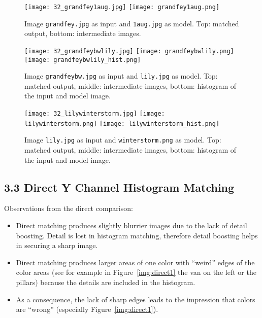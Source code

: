 \documentclass[11pt,a4paper]{article}
\begin{document}
\begin{figure}[htb]
    \begin{center}
    	\texttt{[image: 32\_grandfey1aug.jpg]}
    	\texttt{[image: grandfey1aug.png]}
        \caption{Image \texttt{grandfey.jpg} as input and \texttt{1aug.jpg} as model. Top: matched output, bottom: intermediate images.}
    \end{center}
\end{figure}

\begin{figure}[htb]
    \begin{center}
    	\texttt{[image: 32\_grandfeybwlily.jpg]}
    	\texttt{[image: grandfeybwlily.png]}
    	\texttt{[image: grandfeybwlily\_hist.png]}
        \caption{Image \texttt{grandfeybw.jpg} as input and \texttt{lily.jpg} as model. Top: matched output, middle: intermediate images, bottom: histogram of the input and model image.}
    \end{center}
\end{figure}

\begin{figure}[htb]
    \begin{center}
    	\texttt{[image: 32\_lilywinterstorm.jpg]}
    	\texttt{[image: lilywinterstorm.png]}
    	\texttt{[image: lilywinterstorm\_hist.png]}
        \caption{Image \texttt{lily.jpg} as input and \texttt{winterstorm.png} as model. Top: matched output, middle: intermediate images, bottom: histogram of the input and model image.}
    \end{center}
\end{figure}

\FloatBarrier
\subsection*{3.3 Direct Y Channel Histogram Matching}
Observations from the direct comparison:
\begin{itemize}
\item Direct matching produces slightly blurrier images due to the lack of detail boosting. Detail is lost in histogram matching, therefore detail boosting helps in securing a sharp image.
\item Direct matching produces larger areas of one color with ``weird'' edges of the color areas (see for example in Figure~\ref{img:direct1} the van on the left or the pillars) because the details are included in the histogram.
\item As a consequence, the lack of sharp edges leads to the impression that colors are ``wrong'' (especially Figure~\ref{img:direct1}).
\end{itemize}
\end{document}
